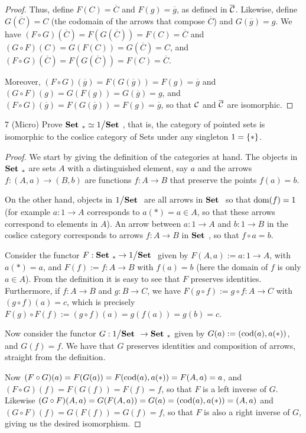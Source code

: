 \begin{proof}
Thus, define $F(C) = \overline{C}$ and $F(g) = \overline{g}$, as defined in $\overline{\mathcal{C}}$.
Likewise, define $G(\overline{C}) = C$ (the codomain of the arrows that compose $\overline{C}$) and $G(\overline{g}) = g$.
We have $(F \circ G)(\overline{C}) = F(G(\overline{C})) = F(C) = \overline{C}$ and $(G \circ F)(C) = G(F(C)) = G(\overline{C}) = C$, and $(F \circ G)(\overline{C}) = F(G(\overline{C})) = F(C) = \overline{C}$.

Moreover, $(F \circ G)(\overline{g}) = F(G(\overline{g})) = F(g) = \overline{g}$ and $(G \circ F)(g) = G(F(g)) = G(\overline{g}) = g$, and $(F \circ G)(\overline{g}) = F(G(\overline{g})) = F(g) = \overline{g}$,
so that $\mathcal{C}$ and $\overline{\mathcal{C}}$ are isomorphic.
\end{proof} 

\begin{exercise}{7 (Micro)}
Prove ${\normalfont\textbf{Set }}_\ast \simeq {\textstyle 1}\big/{\textstyle {\normalfont\textbf{Set }}}$, that is, the category of pointed sets is isomorphic to the coslice category of Sets under any singleton $1 = \{\ast\}$.
\end{exercise}
\begin{proof}
We start by giving the definition of the categories at hand.
The objects in ${\normalfont\textbf{Set }}_\ast$ are sets $A$ with a distinguished element, say $a$ and the arrows $f: (A, a) \to (B, b)$ are functions $f: A \to B$ that preserve the points $f(a) = b$.

On the other hand, objects in ${\textstyle 1}\big/{\textstyle {\normalfont\textbf{Set }}}$ are all arrows in ${\normalfont\textbf{Set }}$ so that $\operatorname{dom}(f) = 1$ (for example $a: 1 \to A$ corresponds to $a(\ast) = a \in A$, so that these arrows correspond to elements in $A$). 
An arrow between $a: 1 \to A$ and $b: 1 \to B$ in the coslice category corresponds to arrows $f: A \to B$ in ${\normalfont\textbf{Set }}$, so that $f \circ a = b$.

Consider the functor $F: {\normalfont\textbf{Set }}_\ast \to {\textstyle 1}\big/{\textstyle {\normalfont\textbf{Set }}}$ given by $F(A, a) := a : 1 \to A$, with $a(\ast) = a$, and $F(f) := f: A \to B$ with $f(a) = b$ (here the domain of $f$ is only $a \in A$).
From the definition it is easy to see that $F$ preserves identities.
Furthermore, if $f: A \to B$ and $g: B \to C$, we have $F(g \circ f) := g \circ f: A \to C$ with $(g \circ f)(a) = c$, which is precisely $F(g) \circ F(f) := (g \circ f)(a) = g(f(a)) = g(b) = c$.

Now consider the functor $G: {\textstyle 1}\big/{\textstyle {\normalfont\textbf{Set }}} \to {\normalfont\textbf{Set }}_\ast$ given by $G(a) := (\operatorname{cod}(a), a(\ast))$, and $G(f) = f$. 
We have that $G$ preserves identities and composition of arrows, straight from the definition.

Now $(F \circ G)(a) = F(G(a)) = F(\operatorname{cod}(a), a(\ast)) = F(A, a) = a$, and $(F \circ G)(f) = F(G(f)) = F(f) = f$, so that $F$ is a left inverse of $G$.
Likewise $(G \circ F)(A, a) = G(F(A, a)) = G(a) = (\operatorname{cod}(a), a(\ast)) = (A, a)$ and $(G \circ F)(f) = G(F(f)) = G(f) = f$, so that $F$ is also a right inverse of $G$, giving us the desired isomorphism.
\end{proof} 

